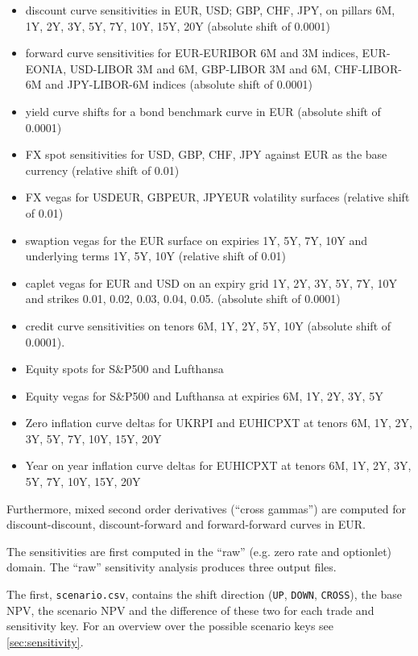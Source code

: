 \begin{itemize}
\item discount curve sensitivities in EUR, USD; GBP, CHF, JPY, on pillars 6M, 1Y, 2Y, 3Y, 5Y, 7Y, 10Y, 15Y, 20Y (absolute shift of 0.0001)
\item forward curve sensitivities for EUR-EURIBOR 6M and 3M indices, EUR-EONIA, USD-LIBOR 3M and 6M, GBP-LIBOR 3M and
  6M, CHF-LIBOR-6M and JPY-LIBOR-6M indices (absolute shift of 0.0001)
\item yield curve shifts for a bond benchmark curve in EUR (absolute shift of 0.0001)
\item FX spot sensitivities for USD, GBP, CHF, JPY against EUR as the base currency (relative shift of 0.01)
\item FX vegas for USDEUR, GBPEUR, JPYEUR volatility surfaces (relative shift of 0.01)
\item swaption vegas for the EUR surface on expiries 1Y, 5Y, 7Y, 10Y and underlying terms 1Y, 5Y, 10Y (relative shift of 0.01)
\item caplet vegas for EUR and USD on an expiry grid 1Y, 2Y, 3Y, 5Y, 7Y, 10Y and strikes 0.01, 0.02, 0.03, 0.04,
  0.05. (absolute shift of 0.0001)
\item credit curve sensitivities on tenors 6M, 1Y, 2Y, 5Y, 10Y (absolute shift of 0.0001).
\item Equity spots for S\&P500 and Lufthansa
\item Equity vegas for S\&P500 and Lufthansa at expiries 6M, 1Y, 2Y, 3Y, 5Y
\item Zero inflation curve deltas for UKRPI and EUHICPXT at tenors 6M, 1Y, 2Y, 3Y, 5Y, 7Y, 10Y, 15Y, 20Y
\item Year on year inflation curve deltas for EUHICPXT at tenors 6M, 1Y, 2Y, 3Y, 5Y, 7Y, 10Y, 15Y, 20Y
\end{itemize}

Furthermore, mixed second order derivatives (``cross gammas'') are computed for discount-discount, discount-forward and
forward-forward curves in EUR.

The sensitivities are first computed in the ``raw'' (e.g. zero rate and optionlet) domain. The ``raw'' sensitivity analysis produces three output files.

The first, {\tt scenario.csv}, contains the shift
direction ({\tt UP}, {\tt DOWN}, {\tt CROSS}), the base NPV, the scenario NPV and the difference of these two for each
trade and sensitivity key. For an overview over the possible scenario keys see \ref{sec:sensitivity}.

